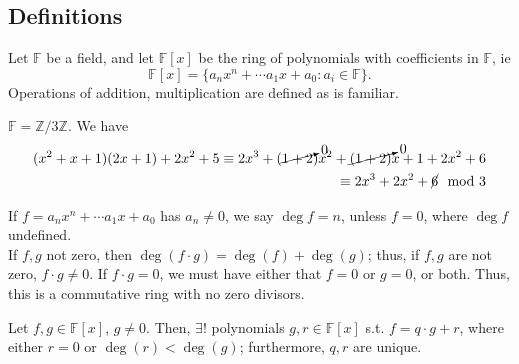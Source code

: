 \documentclass[12pt,oneside]{article}
\begin{document}
\subsection{Definitions}

\begin{definition}
  Let $\mathbb{F}$ be a field, and let $\mathbb{F}[x]$ be the ring of polynomials with coefficients in $\mathbb{F}$, ie \[\mathbb{F}[x] = \{a_n x^{n} + \cdots a_1 x + a_0 : a_i \in \mathbb{F}\}.\]
  Operations of addition, multiplication are defined as is familiar.
\end{definition}

\begin{example}
  $\mathbb{F} = \mathbb{Z}/3 \mathbb{Z}$. We have \begin{align*}
    (x^2 + x + 1)(2x + 1) + 2x^2 + 5 \equiv 2x^3 + (\cancelto{0}{1+2})x^2 + \cancelto{0}{(1+2)}x + 1 + 2x^2 + 6\\
    \equiv 2x^3 + 2x^2 + \cancel{6} \mod 3
  \end{align*}
\end{example}

\begin{definition}[$\deg$]
  If $f = a_n x^n + \cdots a_1 x + a_0$ has $a_n \neq 0$, we say $\deg f = n$, unless $f = 0$, where $\deg f$ undefined.\\
  If $f,g$ not zero, then $\deg (f \cdot g) = \deg (f) + \deg (g)$; thus, if $f,g$ are not zero, $f \cdot g \neq 0$. If $f \cdot g = 0$, we must have either that $f = 0$ or $g = 0$, or both. Thus, this is a commutative ring with no zero divisors. 
\end{definition}

\begin{theorem}
  Let $f,g \in \mathbb{F}[x]$, $g \neq 0$. Then, $\exists !$ polynomials $g, r \in \mathbb{F}[x]$ s.t. $f = q \cdot g + r$, where either $r = 0$ or $\deg (r) < \deg (g)$; furthermore, $q,r$ are unique.
\end{theorem}
\end{document}
